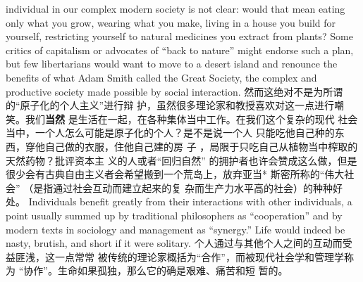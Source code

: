 \begin{paracol}{2}
individual in our complex modern society is not clear: would
that mean eating only what you grow, wearing what you make,
living in a house you build for yourself, restricting yourself to
natural medicines you extract from plants? Some critics of capitalism or advocates of ``back to nature'' might endorse such a
plan, but few libertarians would want to move to a desert island
and renounce the benefits of what Adam Smith called the Great
Society, the complex and productive society made possible by
social interaction.
\switchcolumn
然而这绝对不是为所谓的“原子化的个人主义”进行辩
护，虽然很多理论家和教授喜欢对这一点进行嘲笑。我们\textbf{当然}
是生活在一起，在各种集体当中工作。在我们这个复杂的现代
社会当中，一个人怎么可能是原子化的个人？是不是说一个人
只能吃他自己种的东西，穿他自己做的衣服，住他自己建的房
子 ，局限于只吃自己从植物当中榨取的天然药物？批评资本主
义的人或者“回归自然” 的拥护者也许会赞成这么做，但是
很少会有古典自由主义者会希望搬到一个荒岛上，放弃亚当*
斯密所称的“伟大社会” （是指通过社会互动而建立起来的复
杂而生产力水平高的社会）的种种好处。
\switchcolumn*
Individuals benefit greatly from their interactions with other
individuals, a point usually summed up by traditional philosophers as ``cooperation'' and by modern texts in sociology and
management as ``synergy.'' Life would indeed be nasty, brutish,
and short if it were solitary.
\switchcolumn
个人通过与其他个人之间的互动而受益匪浅，这一点常常
被传统的理论家概括为“合作”，而被现代社会学和管理学称为 “协作”。生命如果孤独，那么它的确是艰难、痛苦和短
暂的。



\end{paracol}
